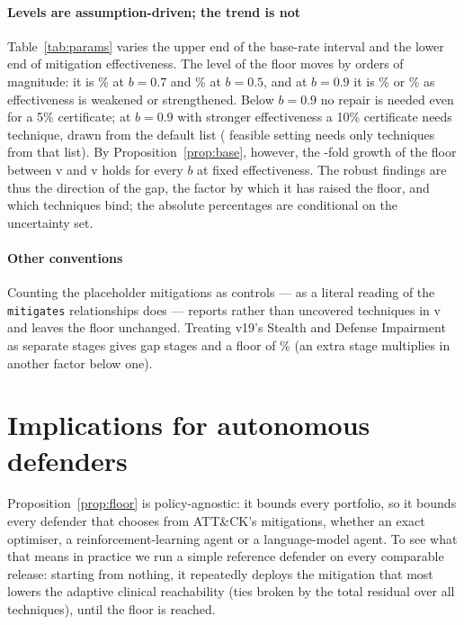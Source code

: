 \documentclass[conference,compsoc]{IEEEtran}
\begin{document}
\paragraph{Levels are assumption-driven; the trend is not} Table~\ref{tab:params}
varies the upper end of the base-rate interval and the lower end of mitigation
effectiveness. The level of the floor moves by orders of magnitude: it is
\GapParamMidFloor\% at $b=0.7$ and \GapParamLowFloor\% at $b=0.5$, and at $b=0.9$ it is
\GapParamWeakFloor\% or \GapParamStrongFloor\% as effectiveness is weakened or
strengthened. Below $b=0.9$ no repair is needed even for a 5\% certificate; at $b=0.9$
with stronger effectiveness a 10\% certificate needs \GapParamStrongRep{} technique,
drawn from the default list (\GapParamSubsetAll{} feasible setting needs only techniques
from that list). By Proposition~\ref{prop:base}, however, the \GapFloorGrowth-fold growth
of the floor between v\GapFirstVersion{} and v\GapLastVersion{} holds for every $b$ at
fixed effectiveness. The robust findings are thus the direction of the gap, the factor
by which it has raised the floor, and which techniques bind; the absolute percentages
are conditional on the uncertainty set.

\paragraph{Other conventions} Counting the placeholder mitigations as controls ---
as a literal reading of the \texttt{mitigates} relationships does --- reports
\GapPlaceholderUnc{} rather than \GapLastUnc{} uncovered techniques in
v\GapLastVersion{} and leaves the floor unchanged. Treating v19's Stealth and Defense
Impairment as separate stages gives \GapSplitStages{} gap stages and a floor of
\GapSplitFloorKOne\% (an extra stage multiplies in another factor below one).

\section{Implications for autonomous defenders}\label{sec:agents}
Proposition~\ref{prop:floor} is policy-agnostic: it bounds every portfolio, so it bounds
every defender that chooses from ATT\&CK's mitigations, whether an exact optimiser, a
reinforcement-learning agent or a language-model agent. To see what that means in
practice we run a simple reference defender on every comparable release: starting
from nothing, it repeatedly deploys the mitigation that most lowers the adaptive
clinical reachability (ties broken by the total residual over all techniques), until
the floor is reached.
\end{document}
